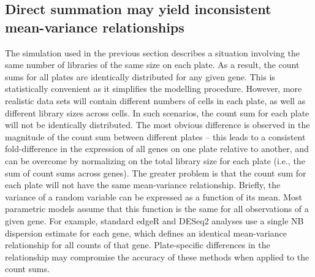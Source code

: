 \documentclass[oupdraft]{bio}
\begin{document}
\subsection{Direct summation may yield inconsistent mean-variance relationships}
The simulation used in the previous section describes a situation involving the same number of libraries of the same size on each plate.
As a result, the count sums for all plates are identically distributed for any given gene.
This is statistically convenient as it simplifies the modelling procedure.
However, more realistic data sets will contain different numbers of cells in each plate, as well as different library sizes across cells.
In such scenarios, the count sum for each plate will not be identically distributed.
The most obvious difference is observed in the magnitude of the count sum between different plates
    -- this leads to a consistent fold-difference in the expression of all genes on one plate relative to another,
    and can be overcome by normalizing on the total library size for each plate (i.e., the sum of count sums across genes).
The greater problem is that the count sum for each plate will not have the same mean-variance relationship.
Briefly, the variance of a random variable can be expressed as a function of its mean.
Most parametric models assume that this function is the same for all observations of a given gene.
For example, standard edgeR and DESeq2 analyses use a single NB dispersion estimate for each gene, which defines an identical mean-variance relationship for all counts of that gene.
Plate-specific differences in the relationship may compromise the accuracy of these methods when applied to the count sums.
\end{document}
